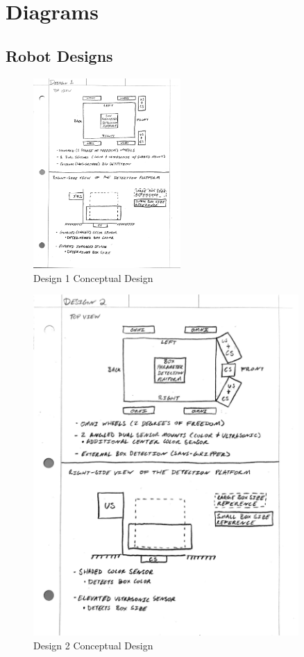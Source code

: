 \documentclass[12pt]{report}
\begin{document}
\chapter{Diagrams}

\section{Robot Designs}
\label{sc:designs}

\begin{figure}[H]
    \centering
    \includegraphics[width=0.5\textwidth]{Images/Designs/Design1.pdf}
    \caption{Design 1 Conceptual Design}
    \label{fig:design1}
\end{figure}

\begin{figure}[H]
    \centering
    \includegraphics[width=0.9\textwidth]{Images/Designs/Design2.pdf}
    \caption{Design 2 Conceptual Design}
    \label{fig:design2}
\end{figure}
\end{document}
